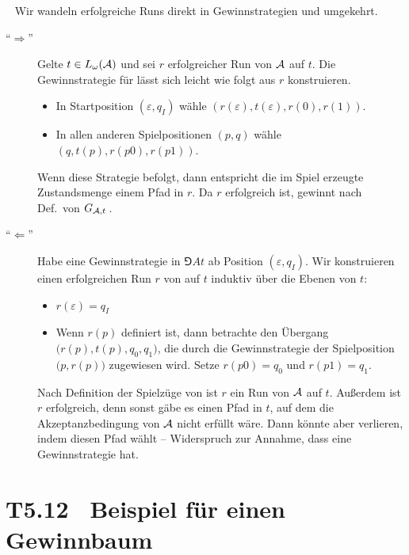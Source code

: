 \documentclass[fontsize=11pt, twoside=false, numbers=autoenddot]{scrbook}
\begin{document}
\par\medskip
{}~
Wir wandeln erfolgreiche Runs direkt in Gewinnstrategien
und umgekehrt.
%
\begin{description}
  \item[{\boldmath "`$\Rightarrow$"'}] 
    Gelte $t \in L_\omega(\mathcal{A})$ und sei $r$ erfolgreicher Run von $\mathcal{A}$ auf $t$.
    Die Gewinnstrategie für \AUT lässt sich leicht wie folgt aus $r$ konstruieren.
    \begin{itemize}
      \item
        In Startposition $(\varepsilon,q_I)$ wähle
        $(r(\varepsilon),t(\varepsilon),r(0),r(1))$.
      \item
        In allen anderen Spielpositionen $(p,q)$ wähle
        $(q,t(p),r(p0),r(p1))$.
    \end{itemize}
    Wenn \AUT diese Strategie befolgt,
    dann entspricht die im Spiel erzeugte Zustandsmenge
    einem Pfad in $r$.
    Da $r$ erfolgreich ist, gewinnt \AUT nach Def.\ von $G_{\mathcal{A},t}$\,.
    \parI
  \item[{\boldmath "`$\Leftarrow$"'}] 
    Habe \AUT eine Gewinnstrategie in $\Game{A}{t}$ ab Position $(\varepsilon,q_I)$.
    Wir konstruieren einen erfolgreichen Run $r$ von \Amc auf $t$
    induktiv über die Ebenen von $t$:
    \begin{itemize}
      \item
        $r(\varepsilon) = q_I$
      \item
        Wenn $r(p)$ definiert ist,
        dann betrachte den Übergang $\big(r(p),t(p),q_0,q_1\big)$,
        die durch die Gewinnstrategie der Spielposition $\big(p,r(p)\big)$
        zugewiesen wird.
        Setze $r(p0) = q_0$ und $r(p1) = q_1$.
    \end{itemize}
    Nach Definition der Spielzüge von \AUT ist $r$ ein Run von $\mathcal{A}$ auf $t$.
    Außerdem ist $r$ erfolgreich,
    denn sonst gäbe es einen Pfad in $t$, auf dem die Akzeptanzbedingung von $\mathcal{A}$
    nicht erfüllt wäre. Dann könnte aber \AUT verlieren, indem \PF diesen Pfad wählt
    -- Widerspruch zur Annahme, dass \AUT eine Gewinnstrategie hat.
    \qedhere
\end{description}

\section*{T5.12~ {\boldmath Beispiel für einen Gewinnbaum}}
\end{document}
